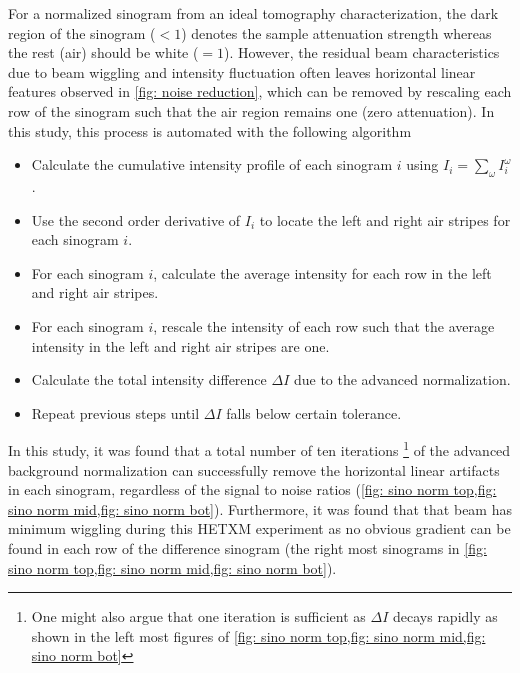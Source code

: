 \documentclass[12pt]{scrartcl}
\begin{document}
For a normalized sinogram from an ideal tomography characterization, the dark region of the sinogram ($<1$) denotes the sample attenuation strength whereas the rest (air) should be white ($=1$).
However, the residual beam characteristics due to beam wiggling and intensity fluctuation often leaves horizontal linear features observed in \cref{fig: noise reduction}, which can be removed by rescaling each row of the sinogram such that the air region remains one (zero attenuation).
In this study, this process is automated with the following algorithm
%
\begin{itemize}
\item Calculate the cumulative intensity profile of each sinogram $i$ using $I_i = \sum_\omega I^\omega_i$.
\item Use the second order derivative of $I_i$ to locate the left and right air stripes for each sinogram $i$.
\item For each sinogram $i$, calculate the average intensity for each row in the left and right air stripes.
\item For each sinogram $i$, rescale the intensity of each row such that the average intensity in the left and right air stripes are one.
\item Calculate the total intensity difference $\Delta I$ due to the advanced normalization.
\item Repeat previous steps until $\Delta I$ falls below certain tolerance.
\end{itemize}

In this study, it was found that a total number of ten iterations
\footnote{
One might also argue that one iteration is sufficient as $\Delta I$ decays rapidly as shown in the left most figures of \cref{fig: sino norm top,fig: sino norm mid,fig: sino norm bot}
} of the advanced background normalization can successfully remove the horizontal linear artifacts in each sinogram, regardless of the signal to noise ratios (\cref{fig: sino norm top,fig: sino norm mid,fig: sino norm bot}).
Furthermore, it was found that that beam has minimum wiggling during this HETXM experiment as no obvious gradient can be found in each row of the difference sinogram (the right most sinograms in \cref{fig: sino norm top,fig: sino norm mid,fig: sino norm bot}).
\end{document}
